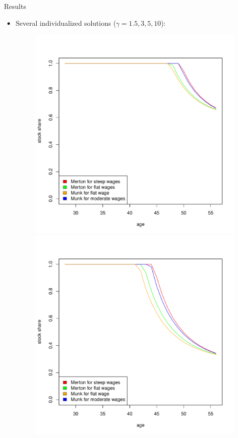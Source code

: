 \documentclass{beamer}
\begin{document}
\begin{frame}[allowframebreaks]{Results}
\begin{itemize}
\framebreak


	\item Several individualized solutions ($\gamma=1.5,3,5,10$):

\begin{figure}
		\includegraphics[scale=0.25]{figs/individuals15.pdf}
		\includegraphics[scale=0.25]{figs/individuals3.pdf}

\end{figure}
\end{itemize}
\end{frame}
\end{document}
